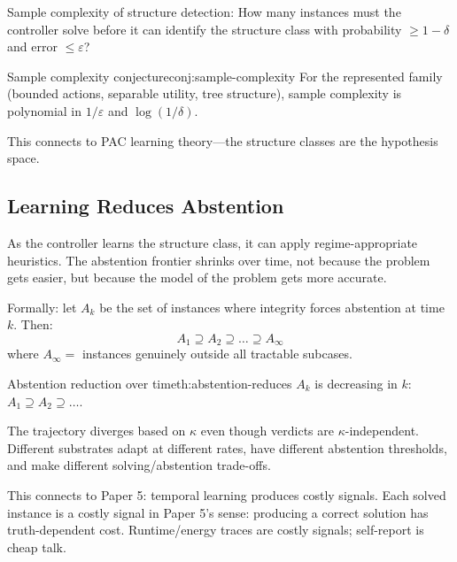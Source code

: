 Sample complexity of structure detection:
How many instances must the controller solve before it can identify the structure class with probability $\geq 1 - \delta$ and error $\leq \varepsilon$?

\begin{claim}{Sample complexity conjecture}{conj:sample-complexity}
For the represented family (bounded actions, separable utility, tree structure), sample complexity is polynomial in $1/\varepsilon$ and $\log(1/\delta)$.
\end{claim}

This connects to PAC learning theory---the structure classes are the hypothesis space.

\subsection{Learning Reduces Abstention}

As the controller learns the structure class, it can apply regime-appropriate heuristics. The abstention frontier shrinks over time, not because the problem gets easier, but because the model of the problem gets more accurate.

Formally: let $A_k$ be the set of instances where integrity forces abstention at time $k$. Then:
\[
A_1 \supseteq A_2 \supseteq \ldots \supseteq A_\infty
\]
where $A_\infty =$ instances genuinely outside all tractable subcases.

\begin{claim}{Abstention reduction over time}{th:abstention-reduces}
$A_k$ is decreasing in $k$: $A_1 \supseteq A_2 \supseteq \ldots$.
\end{claim}


The trajectory diverges based on $\kappa$ even though verdicts are $\kappa$-independent. Different substrates adapt at different rates, have different abstention thresholds, and make different solving/abstention trade-offs.

This connects to Paper 5: temporal learning produces costly signals. Each solved instance is a costly signal in Paper 5's sense: producing a correct solution has truth-dependent cost. Runtime/energy traces are costly signals; self-report is cheap talk.
